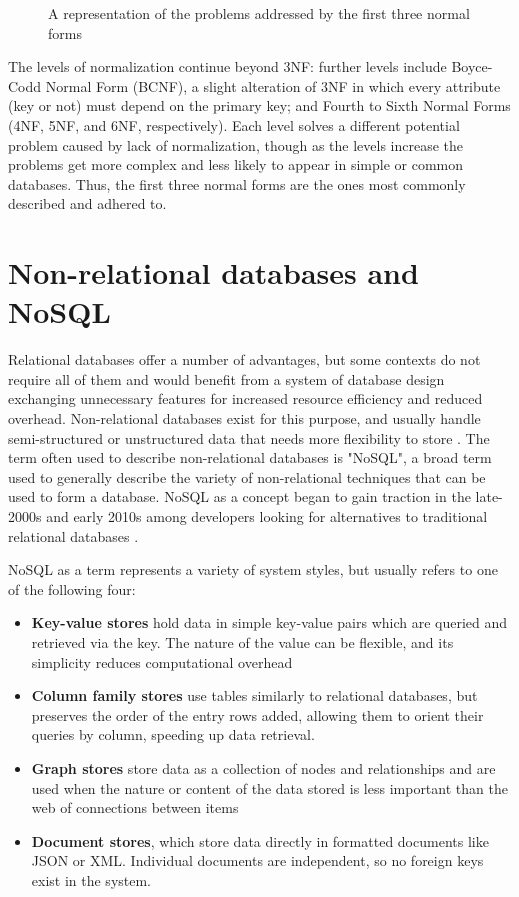 \begin{figure}[!ht]
	\begin{center}
		\caption{A representation of the problems addressed by the first three normal forms}\label{normalforms}
	\end{center}
\end{figure}

The levels of normalization continue beyond 3NF: further levels include Boyce-Codd Normal Form (BCNF), a slight alteration of 3NF in which every attribute (key or not) must depend on the primary key; and Fourth to Sixth Normal Forms (4NF, 5NF, and 6NF, respectively). Each level solves a different potential problem caused by lack of normalization, though as the levels increase the problems get more complex and less likely to appear in simple or common databases. Thus, the first three normal forms are the ones most commonly described and adhered to.

\section{Non-relational databases and NoSQL}

Relational databases offer a number of advantages, but some contexts do not require all of them and would benefit from a system of database design exchanging unnecessary features for increased resource efficiency and reduced overhead. Non-relational databases exist for this purpose, and usually handle semi-structured or unstructured data that needs more flexibility to store \cite{faulkes_sql_nodate}. The term often used to describe non-relational databases is "NoSQL", a broad term used to generally describe the variety of non-relational techniques that can be used to form a database. NoSQL as a concept began to gain traction in the late-2000s and early 2010s among developers looking for alternatives to traditional relational databases \cite{kelly_making_2013}.

NoSQL as a term represents a variety of system styles, but usually refers to one of the following four:

\begin{itemize}
	\item \textbf{Key-value stores} hold data in simple key-value pairs which are queried and retrieved via the key. The nature of the value can be flexible, and its simplicity reduces computational overhead
	\item \textbf{Column family stores} use tables similarly to relational databases, but preserves the order of the entry rows added, allowing them to orient their queries by column, speeding up data retrieval. 
	\item \textbf{Graph stores} store data as a collection of nodes and relationships and are used when the nature or content of the data stored is less important than the web of connections between items
	\item \textbf{Document stores}, which store data directly in formatted documents like JSON or XML. Individual documents are independent, so no foreign keys exist in the system.
\end{itemize}

